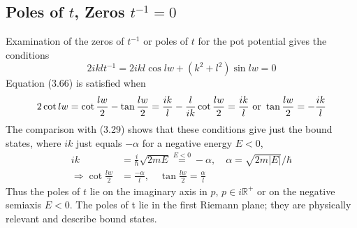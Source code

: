 \subsection{Poles of $t$, Zeros $t^{-1} = 0$}
 Examination of the zeros of $t^{-1}$ or poles of $t$ for the pot potential gives the conditions
\begin{equation}
    2 i k l t^{-1}=2 i k l \cos l w+\left(k^{2}+l^{2}\right) \sin l w=0
    \end{equation}
Equation (3.66) is satisfied when
\begin{equation}
    2 \cot l w=\cot \frac{l w}{2}-\tan \frac{l w}{2}=\frac{i k}{l}-\frac{l}{i k}\\
    \cot \frac{l w}{2}=\frac{i k}{l} \text {  or  } \tan \frac{l w}{2}=-\frac{i k}{l}
    \end{equation}
The comparison with (3.29) shows that these conditions give just the bound states, where $ik$ just equals $-\alpha$ for a negative energy $E <0$,
\begin{equation}
\begin{aligned} i k &=\frac{i}{\hbar} \sqrt{2 m E} \stackrel{E<0}{=}-\alpha, \quad \alpha=\sqrt{2 m|E|} / \hbar \\ \Rightarrow \cot \frac{l w}{2} &=\frac{-\alpha}{l}, \quad \tan \frac{l w}{2}=\frac{\alpha}{l} \end{aligned}
    \end{equation}
Thus the poles of $t$ lie on the imaginary axis in $p$, $p \in i\mathbb{R}^+$ or on the negative semiaxis $E <0$. The poles of t lie in the first Riemann plane; they are physically relevant and describe bound states. 
